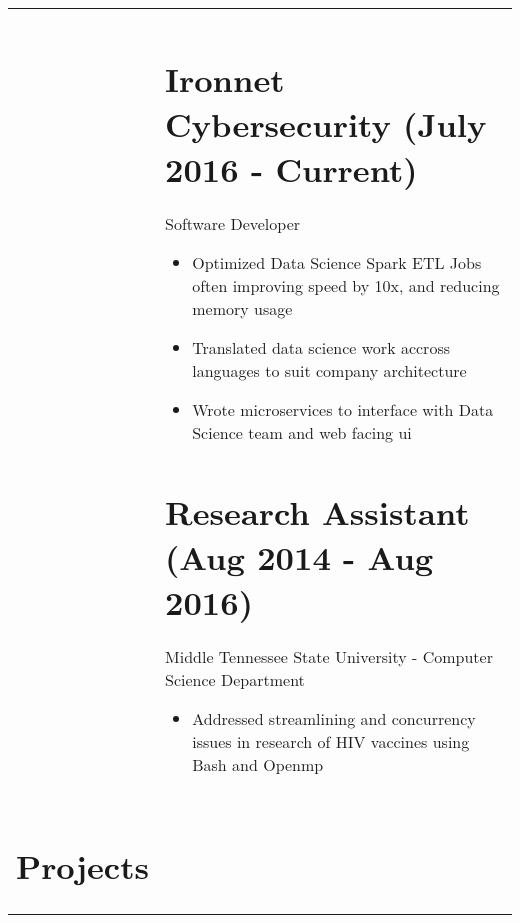 \documentclass[10pt]{article}
\begin{document}
\begin{tabularx}{\textwidth}{p{3cm} X}
& \section*{Ironnet Cybersecurity (July 2016 - Current)}
Software Developer
\begin{itemize}
\setlength{\itemsep}{1pt}
\item Optimized Data Science Spark ETL Jobs often improving speed by 10x, and reducing memory usage
\item Translated data science work accross languages to suit company architecture
\item Wrote microservices to interface with Data Science team and web facing ui
\end{itemize}
\section*{Research Assistant (Aug 2014 - Aug 2016)}
Middle Tennessee State University - Computer Science Department
\begin{itemize}
\setlength{\itemsep}{1pt}
\item Addressed streamlining and concurrency issues in research of HIV vaccines using Bash and Openmp
\end{itemize}\\
\section*{Projects} &

\end{tabularx}
\end{document}
